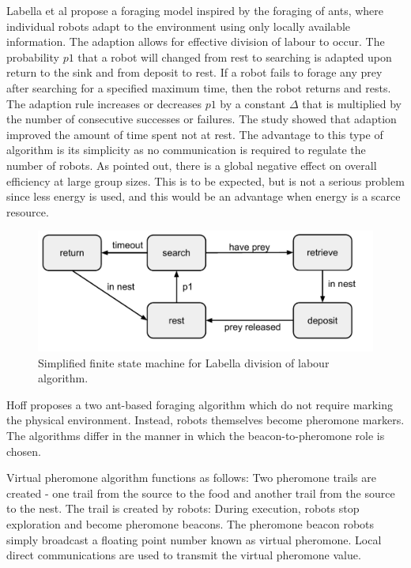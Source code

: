 Labella et al \cite{labella2006division} propose a foraging model inspired by the foraging of ants, where individual robots adapt to the environment using only locally available information. The adaption allows for effective division of labour to occur. The probability $p1$ that a robot will changed from rest to searching is adapted upon return to the sink and from deposit to rest. If a robot fails to forage any prey after searching for a specified maximum time, then the robot returns and rests. 
The adaption rule increases or decreases $p1$ by a constant $\Delta$ that is multiplied by the number of consecutive successes or failures. The study showed that adaption improved the amount of time spent not at rest. The advantage to this type of algorithm is its simplicity as no communication is required to regulate the number of robots. As pointed out, there is a global negative effect on overall efficiency at large group sizes. This is to be expected, but is not a serious problem since less energy is used, and this would be an advantage when energy is a scarce resource. %

\begin{figure}
\includegraphics[width=\textwidth]{chapters/chapter2/figures/LabellaFSM.pdf}
\caption{Simplified finite state machine for Labella division of labour algorithm. }
\end{figure} 

Hoff \cite{hoff2010two} proposes a two ant-based foraging algorithm which do not require marking the physical environment. Instead, robots themselves become pheromone markers. The algorithms differ in the manner in which the beacon-to-pheromone role is chosen. 

Virtual pheromone algorithm functions as follows: Two pheromone trails are created - one trail from the source to the food and another trail from the source to the nest. The trail is created by robots: During execution, robots stop exploration and become pheromone beacons. The pheromone beacon robots simply broadcast a floating point number known as virtual pheromone. 
Local direct communications are used to transmit the virtual pheromone value.

